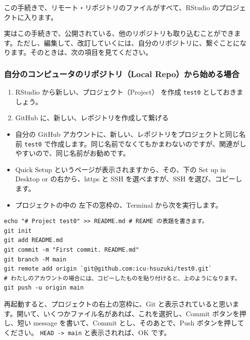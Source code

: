 \documentclass[
]{bxjsbook}
\providecommand{\tightlist}{%
  \setlength{\itemsep}{0pt}\setlength{\parskip}{0pt}}
\theoremstyle{definition}
\theoremstyle{definition}
\theoremstyle{definition}
\theoremstyle{definition}
\theoremstyle{remark}
\begin{document}
この手続きで、リモート・リポジトリのファイルがすべて、RStudio のプロジェクトに入ります。

実はこの手続きで、公開されている、他のリポジトリも取り込むことができます。ただし、編集して、改訂していくには、自分のリポジトリに、繋ぐことになります。そのときは、次の項目を見てください。

\hypertarget{ux81eaux5206ux306eux30b3ux30f3ux30d4ux30e5ux30fcux30bfux306eux30eaux30ddux30b8ux30c8ux30ealocal-repoux304bux3089ux59cbux3081ux308bux5834ux5408}{%
\subsubsection{自分のコンピュータのリポジトリ（Local Repo）から始める場合}\label{ux81eaux5206ux306eux30b3ux30f3ux30d4ux30e5ux30fcux30bfux306eux30eaux30ddux30b8ux30c8ux30ealocal-repoux304bux3089ux59cbux3081ux308bux5834ux5408}}

\begin{enumerate}
\def\labelenumi{\arabic{enumi}.}
\tightlist
\item
  RStudio から新しい、プロジェクト（Project） を作成 \texttt{test0} としておきましょう。
\item
  GitHub に、新しい、レポジトリを作成して繋げる
\end{enumerate}

\begin{itemize}
\tightlist
\item
  自分の GitHub アカウントに、新しい、レポジトリをプロジェクトと同じ名前 \texttt{test0} で作成します。同じ名前でなくてもかまわないのですが、関連がしやすいので、同じ名前がお勧めです。
\item
  Quick Setup というページが表示されますから、その、下の Set up in Desktop or の右から、https と SSH を選べますが、SSH を選び、コピーします。
\item
  プロジェクトの中の 左下の窓枠の、Terminal から次を実行します。
\end{itemize}

\begin{verbatim}
echo "# Project test0" >> README.md # REAME の表題を書きます。
git init
git add README.md
git commit -m "First commit. README.md"
git branch -M main
git remote add origin `git@github.com:icu-hsuzuki/test0.git`
# わたしのアカウントの場合には、コピーしたものを貼り付けると、上のようになります。
git push -u origin main
\end{verbatim}

再起動すると、プロジェクトの右上の窓枠に、Git と表示されていると思います。開いて、いくつかファイル名があれば、これを選択し、Commit ボタンを押し、短い message を書いて、Commit とし、そのあとで、Push ボタンを押してください。 \texttt{HEAD\ -\textgreater{}\ main} と表示されれば、OK です。
\end{document}
